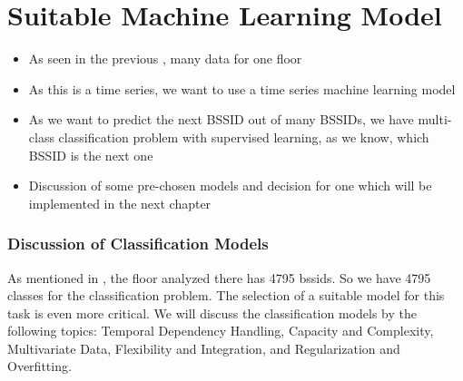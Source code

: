 \chapter{Suitable Machine Learning Model}\label{sec:discuss-ml}


\begin{itemize}
    \item As seen in the previous , many data for one floor 
    \item As this is a time series, we want to use a time series machine learning model
    \item As we want to predict the next BSSID out of many BSSIDs, we have multi-class classification problem with supervised learning, as we know, which BSSID is the next one
    \item Discussion of some pre-chosen models and decision for one which will be implemented in the next chapter
\end{itemize}



\subsection{Discussion of Classification Models}
As mentioned in , the floor analyzed there has 4795 \acp{bssid}.
So we have 4795 classes for the classification problem.
The selection of a suitable model for this task is even more critical.
We will discuss the classification models by the following topics: Temporal Dependency Handling, Capacity and Complexity, Multivariate Data, Flexibility and Integration, and Regularization and Overfitting. \\

